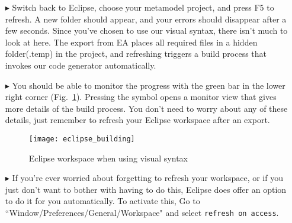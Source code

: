 \begin{itemize}
\item[$\blacktriangleright$] Switch back to Eclipse, choose your metamodel project, and press F5 to refresh. A new folder should appear, and your errors should
disappear after a few seconds. Since you've chosen to use our visual syntax, there isn't much to look at here. The export from EA places all required files in a
hidden folder(.temp) in the project, and refreshing triggers a build process that invokes our code generator automatically. 

\item[$\blacktriangleright$] You should be able to monitor the progress with the green bar in the lower right corner (Fig.~\ref{fig_eclipseBuild}). Pressing the
symbol opens a monitor view that gives more details of the build process. You don't need to worry about any of these details, just remember to refresh your
Eclipse workspace after an export.


\begin{figure}[htbp]
	\centering
  \texttt{[image: eclipse\_building]}
	\caption{Eclipse workspace when using visual syntax} 
	\label{fig_eclipseBuild} 
\end{figure}

\item[$\blacktriangleright$] If you're ever worried about forgetting to refresh your workspace, or if you just don't want to bother with having to do this,
Eclipse does offer an option to do it for you automatically. To activate this, Go to ``Window/Preferences/General/Workspace" and select \texttt{refresh on
access}.

\end{itemize}